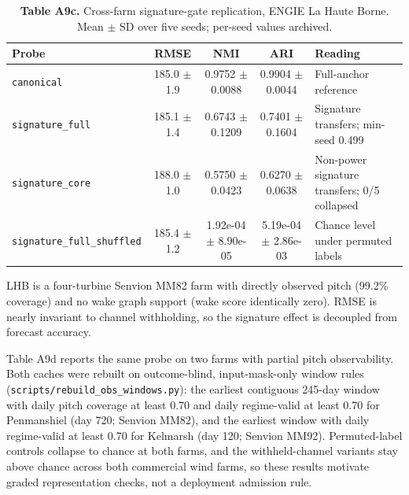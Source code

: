 \documentclass[
  journal]{IEEEtran}
\begin{document}
\begin{table}[!t]
\centering
\fontsize{8.0pt}{9.2pt}\selectfont
\setlength{\tabcolsep}{3.5pt}
\renewcommand{\arraystretch}{1.03}
\caption*{\textbf{Table A9c.} Cross-farm signature-gate replication, ENGIE La Haute Borne. Mean $\pm$ SD over five seeds; per-seed values archived.}
%
\begin{tabularx}{\textwidth}{@{}l c c c >{\raggedright\arraybackslash}X@{}}
\toprule
Probe & RMSE & NMI & ARI & Reading \\
\midrule
\texttt{canonical} & 185.0 $\pm$ 1.9 & 0.9752 $\pm$ 0.0088 & 0.9904 $\pm$ 0.0044 & Full-anchor reference \\
\texttt{signature\_full} & 185.1 $\pm$ 1.4 & 0.6743 $\pm$ 0.1209 & 0.7401 $\pm$ 0.1604 & Signature transfers; min-seed 0.499 \\
\texttt{signature\_core} & 188.0 $\pm$ 1.0 & 0.5750 $\pm$ 0.0423 & 0.6270 $\pm$ 0.0638 & Non-power signature transfers; 0/5 collapsed \\
\texttt{signature\_full\_shuffled} & 185.4 $\pm$ 1.2 & 1.92e-04 $\pm$ 8.90e-05 & 5.19e-04 $\pm$ 2.86e-03 & Chance level under permuted labels \\
\bottomrule
\end{tabularx}
\vspace{1mm}
\raggedright\fontsize{8.0pt}{9.0pt}\selectfont LHB is a four-turbine Senvion MM82 farm with directly observed pitch (99.2\% coverage) and no wake graph support (wake score identically zero). RMSE is nearly invariant to channel withholding, so the signature effect is decoupled from forecast accuracy.
\end{table}

Table A9d reports the same probe on two farms with partial pitch
observability. Both caches were rebuilt on outcome-blind,
input-mask-only window rules
(\texttt{scripts/rebuild\_obs\_windows.py}): the earliest contiguous
245-day window with daily pitch coverage at least 0.70 and daily
regime-valid at least 0.70 for Penmanshiel (day 720; Senvion MM82), and
the earliest window with daily regime-valid at least 0.70 for Kelmarsh
(day 120; Senvion MM92). Permuted-label controls collapse to chance at
both farms, and the withheld-channel variants stay above chance across
both commercial wind farms, so these results motivate graded
representation checks, not a deployment admission rule.
\end{document}
